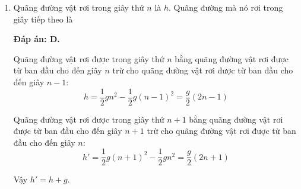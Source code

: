 \begin{enumerate}[label=\bfseries Câu \arabic*:]
	
	\item {}
	
	
	{Quãng đường vật rơi trong giây thứ $n$ là $h$. Quãng đường mà nó rơi trong giây tiếp theo là
		
		
	}
	\hideall
	{	\textbf{Đáp án: D.}
		
		Quãng đường vật rơi được trong giây thứ $n$ bằng quãng đường vật rơi được từ ban đầu cho đến giây $n$ trừ cho quãng đường vật rơi được từ ban đầu cho đến giây $n-1$: $$h=\dfrac{1}{2}gn^2-\dfrac{1}{2}g(n-1)^2=\dfrac{g}{2}(2n-1)$$
		
		Quãng đường vật rơi được trong giây thứ $n+1$ bằng quãng đường vật rơi được từ ban đầu cho đến giây $n+1$ trừ cho quãng đường vật rơi được từ ban đầu cho đến giây $n$:
		$$h'=\dfrac{1}{2}g(n+1)^2-\dfrac{1}{2}gn^2 = \dfrac{g}{2}(2n+1)$$
		
		Vậy $h'=h+g$.
	}
\end{enumerate}

